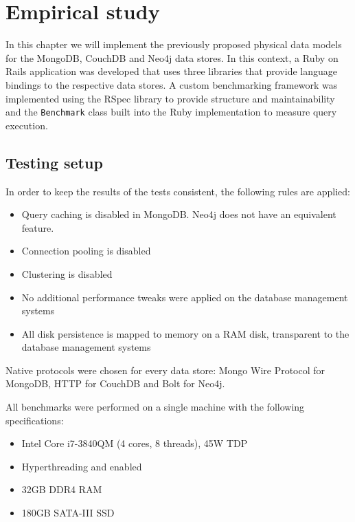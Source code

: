 \chapter{Empirical study}
\label{ch:empirical-study}

In this chapter we will implement the previously proposed physical data models for the MongoDB, CouchDB and Neo4j data stores.
In this context, a Ruby on Rails application was developed that uses three libraries that provide language bindings to the respective data stores.
A custom benchmarking framework was implemented using the RSpec library to provide structure and maintainability and the \texttt{Benchmark} class built into the Ruby implementation to measure query execution.


\section{Testing setup}
\label{sec:testing-setup}

In order to keep the results of the tests consistent, the following rules are applied:

\begin{itemize}
  \item Query caching is disabled in MongoDB. Neo4j does not have an equivalent feature.
  \item Connection pooling is disabled
  \item Clustering is disabled
  \item No additional performance tweaks were applied on the database management systems
  \item All disk persistence is mapped to memory on a RAM disk, transparent to the database management systems
\end{itemize}

Native protocols were chosen for every data store: Mongo Wire Protocol for MongoDB, HTTP for CouchDB and Bolt for Neo4j.

All benchmarks were performed on a single machine with the following specifications:

\begin{itemize}
  \item Intel Core i7-3840QM (4 cores, 8 threads), 45W TDP
  \item Hyperthreading and  enabled
  \item 32GB DDR4 RAM
  \item 180GB SATA-III SSD
\end{itemize}

